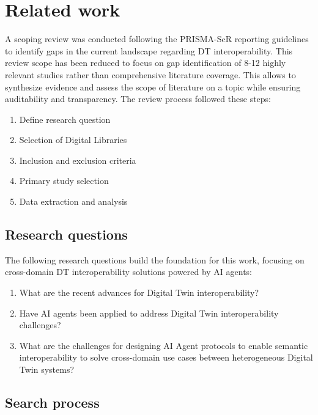 \chapter{Related work}
\label{chap:related-work}

A scoping review was conducted following the PRISMA-ScR reporting guidelines~\cite{tricco2018}
    to identify gaps in the current landscape regarding DT interoperability.
This review scope has been reduced to focus on gap identification of 8-12 highly relevant studies
    rather than comprehensive literature coverage.
This allows to synthesize evidence and assess the scope of literature on a topic while ensuring
    auditability and transparency.
The review process followed these steps:

\begin{enumerate}
    \item Define research question
    \item Selection of Digital Libraries
    \item Inclusion and exclusion criteria
    \item Primary study selection
    \item Data extraction and analysis
\end{enumerate}

\section{Research questions}

The following research questions build the foundation for this work, focusing on
    cross-domain DT interoperability solutions powered by AI agents:

\begin{enumerate}[label=RQ\arabic*:]
    \item \label{rq:digital-twin} What are the recent advances for Digital Twin interoperability?
    \item \label{rq:ai-agents} Have AI agents been applied to address Digital Twin interoperability challenges?
    \item \label{rq:cross-domain} What are the challenges for designing 
        AI Agent protocols to 
        enable semantic interoperability to solve
        cross-domain use cases between heterogeneous Digital Twin systems?
\end{enumerate}

\section{Search process}


